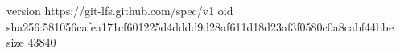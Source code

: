 version https://git-lfs.github.com/spec/v1
oid sha256:581056cafea171cf601225d4dddd9d28af611d18d23af3f0580c0a8cabf44bbe
size 43840
